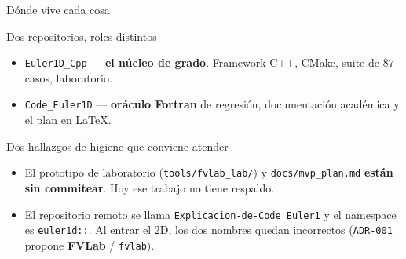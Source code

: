 \documentclass[aspectratio=169,10pt]{beamer}
\newcommand{\cod}[1]{\texttt{\small #1}}
\begin{document}
\begin{frame}[shrink]{Dónde vive cada cosa}
  \small
  \begin{block}{Dos repositorios, roles distintos}
    \begin{itemize}
      \item \cod{Euler1D\_Cpp} — \textbf{el núcleo de grado}. Framework C++,
            CMake, suite de 87 casos, laboratorio.
      \item \cod{Code\_Euler1D} — \textbf{oráculo Fortran} de regresión,
            documentación académica y el plan en LaTeX.
    \end{itemize}
  \end{block}

  \begin{alertblock}{Dos hallazgos de higiene que conviene atender}
    \begin{itemize}
      \item El prototipo de laboratorio (\cod{tools/fvlab\_lab/}) y
            \cod{docs/mvp\_plan.md} \textbf{están sin commitear}. Hoy ese trabajo
            no tiene respaldo.
      \item El repositorio remoto se llama \cod{Explicacion-de-Code\_Euler1} y el
            namespace es \cod{euler1d::}. Al entrar el 2D, los dos nombres quedan
            incorrectos (\cod{ADR-001} propone \textbf{FVLab} / \cod{fvlab}).
    \end{itemize}
  \end{alertblock}
\end{frame}
\end{document}
